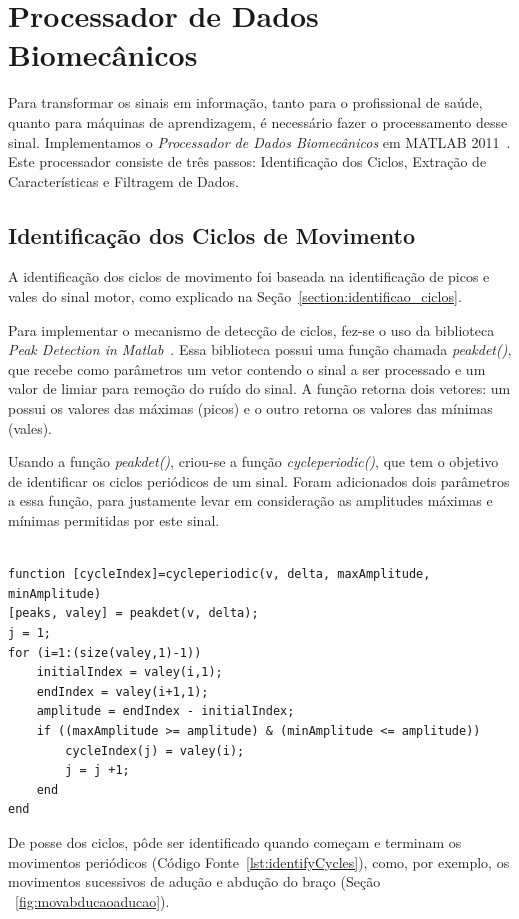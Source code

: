 \section{Processador de Dados Biomecânicos}\label{sec:processador_bio}
Para transformar os sinais em informação, tanto para o profissional de saúde, quanto para máquinas de aprendizagem, é necessário fazer o processamento desse sinal. Implementamos o \textit{Processador de Dados Biomecânicos} em MATLAB 2011~\cite{matlab2011}. Este processador consiste de três passos: Identificação dos Ciclos, Extração de Características e Filtragem de Dados.

\subsection{Identificação dos Ciclos de Movimento} 
A identificação dos ciclos de movimento foi baseada na identificação de picos e vales do sinal motor, como explicado na Seção~\ref{section:identificao_ciclos}. 

Para implementar o mecanismo de detecção de ciclos, fez-se o uso da biblioteca \textit{Peak Detection in Matlab}~\cite{peakdetect}. Essa biblioteca possui uma função chamada \textit{peakdet()}, que recebe como parâmetros um vetor contendo o sinal a ser processado e um valor de limiar para remoção do ruído do sinal. A função retorna dois vetores: um possui os valores das máximas (picos) e o outro retorna os valores das mínimas (vales).

Usando a função \textit{peakdet()}, criou-se a função \textit{cycleperiodic()}, que tem o objetivo de identificar os ciclos periódicos de um sinal. Foram adicionados dois parâmetros a essa função, para justamente levar em consideração as amplitudes máximas e mínimas permitidas por este sinal.

\begin{lstlisting}[frame=single, caption=Função de Ciclo Periódico]  % Start your code-block

function [cycleIndex]=cycleperiodic(v, delta, maxAmplitude, minAmplitude)
[peaks, valey] = peakdet(v, delta);
j = 1;
for (i=1:(size(valey,1)-1))    
    initialIndex = valey(i,1);
    endIndex = valey(i+1,1);
    amplitude = endIndex - initialIndex;
    if ((maxAmplitude >= amplitude) & (minAmplitude <= amplitude))
        cycleIndex(j) = valey(i);
        j = j +1;
    end
end
\end{lstlisting}

De posse dos ciclos, pôde ser identificado quando começam e terminam os movimentos periódicos (Código Fonte~\ref{lst:identifyCycles}), como, por exemplo, os movimentos sucessivos de adução e abdução do braço (Seção ~\ref{fig:movabducaoaducao}). 


